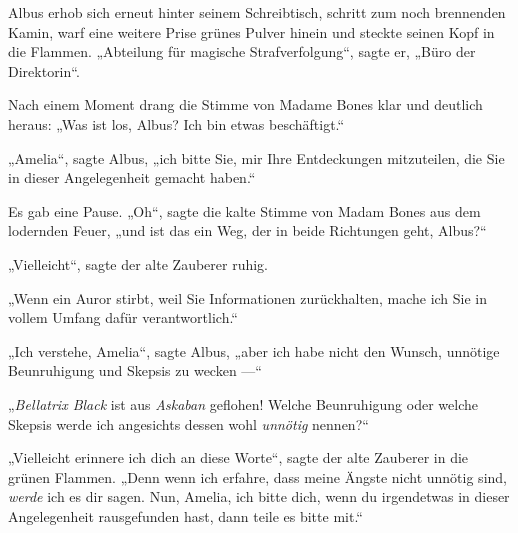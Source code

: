Albus erhob sich erneut hinter seinem Schreibtisch, schritt zum noch brennenden Kamin, warf eine weitere Prise grünes Pulver hinein und steckte seinen Kopf in die Flammen.
„Abteilung für magische Strafverfolgung“, sagte er,
„Büro der Direktorin“.

Nach einem Moment drang die Stimme von Madame Bones klar und deutlich heraus:
„Was ist los, Albus? Ich bin etwas beschäftigt.“

„Amelia“, sagte Albus, „ich bitte Sie, mir Ihre Entdeckungen mitzuteilen, die Sie in dieser Angelegenheit gemacht haben.“

Es gab eine Pause.
„Oh“, sagte die kalte Stimme von Madam Bones aus dem lodernden Feuer, „und ist das ein Weg, der in beide Richtungen geht, Albus?“

„Vielleicht“, sagte der alte Zauberer ruhig.

„Wenn ein Auror stirbt, weil Sie Informationen zurückhalten, mache ich Sie in vollem Umfang dafür verantwortlich.“

„Ich verstehe, Amelia“, sagte Albus, „aber ich habe nicht den Wunsch, unnötige Beunruhigung und Skepsis zu wecken —“

„\emph{Bellatrix Black} ist aus \emph{Askaban} geflohen! Welche Beunruhigung oder welche Skepsis werde ich angesichts dessen wohl \emph{unnötig} nennen?“

„Vielleicht erinnere ich dich an diese Worte“, sagte der alte Zauberer in die grünen Flammen.
„Denn wenn ich erfahre, dass meine Ängste nicht unnötig sind, \emph{werde} ich es dir sagen. Nun, Amelia, ich bitte dich, wenn du irgendetwas in dieser Angelegenheit rausgefunden hast, dann teile es bitte mit.“


